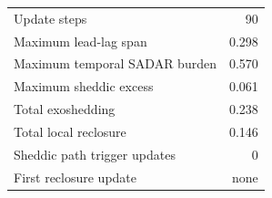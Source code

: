 \begin{tabular}{lr}
\toprule
Update steps & 90 \\
Maximum lead-lag span & 0.298 \\
Maximum temporal SADAR burden & 0.570 \\
Maximum sheddic excess & 0.061 \\
Total exoshedding & 0.238 \\
Total local reclosure & 0.146 \\
Sheddic path trigger updates & 0 \\
First reclosure update & none \\
\bottomrule
\end{tabular}
